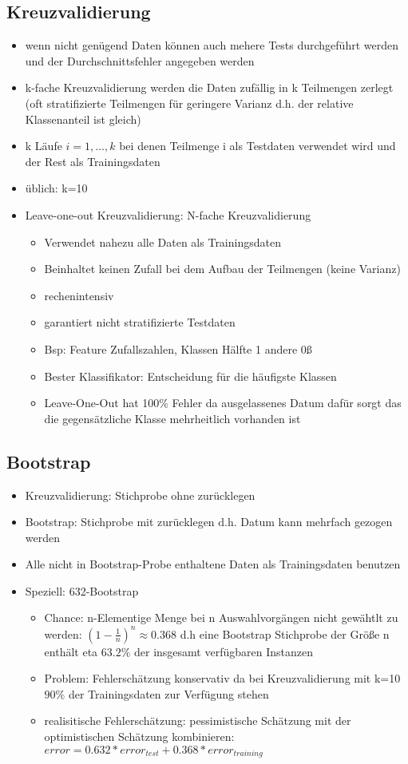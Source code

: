 \documentclass{article} %
\begin{document}
	\subsection{Kreuzvalidierung}
	\begin{itemize}
		\item wenn nicht genügend Daten können auch mehere Tests durchgeführt werden und der Durchschnittsfehler angegeben werden
		\item k-fache Kreuzvalidierung werden die Daten zufällig in k Teilmengen zerlegt (oft stratifizierte Teilmengen für geringere Varianz d.h. der relative Klassenanteil ist gleich)
		\item k Läufe $i = 1,\dots,k$ bei denen Teilmenge i als Testdaten verwendet wird und der Rest als Trainingsdaten
		\item üblich: k=10
		\item Leave-one-out Kreuzvalidierung: N-fache Kreuzvalidierung
		\begin{itemize}
			\item Verwendet nahezu alle Daten als Trainingsdaten
			\item Beinhaltet keinen Zufall bei dem Aufbau der Teilmengen (keine Varianz)
			\item rechenintensiv
			\item garantiert nicht stratifizierte Testdaten
			\item Bsp: Feature Zufallszahlen, Klassen Hälfte 1 andere 0ß
			\item Bester Klassifikator: Entscheidung für die häufigste Klassen
			\item Leave-One-Out hat 100\% Fehler da ausgelassenes Datum dafür sorgt das die gegensätzliche Klasse mehrheitlich vorhanden ist 
		\end{itemize}
	\end{itemize}
	\subsection{Bootstrap}
	\begin{itemize}
		\item Kreuzvalidierung: Stichprobe ohne zurücklegen
		\item Bootstrap: Stichprobe mit zurücklegen d.h. Datum kann mehrfach gezogen werden
		\item Alle nicht in Bootstrap-Probe enthaltene Daten als Trainingsdaten benutzen
		\item Speziell: 632-Bootstrap
		\begin{itemize}
			\item Chance: n-Elementige Menge bei n Auswahlvorgängen nicht gewähtlt zu werden: $(1-\frac{1}{n})^n \approx 0.368$ d.h eine Bootstrap Stichprobe der Größe n enthält eta $63.2\%$ der insgesamt verfügbaren Instanzen
			\item Problem: Fehlerschätzung konservativ da bei Kreuzvalidierung mit k=10 $90\%$ der Trainingsdaten zur Verfügung stehen
			\item realisitische Fehlerschätzung: pessimistische Schätzung mit der optimistischen Schätzung kombinieren: $error = 0.632*error_{test}+0.368*error_{training}$
		\end{itemize}
	\end{itemize}
\end{document}
